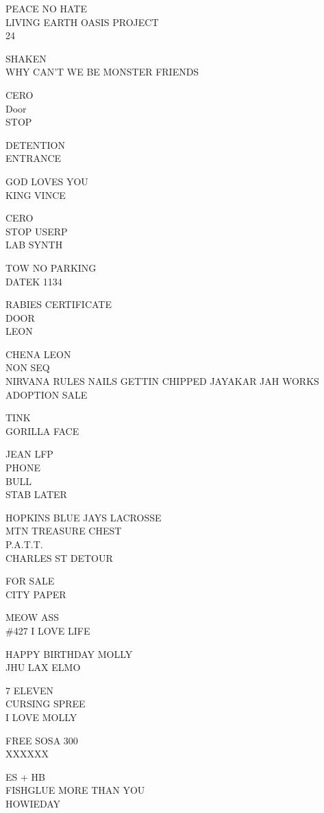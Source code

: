 \documentclass[10pt,letterpaper]{article}
\begin{document}
PEACE NO HATE\\
LIVING EARTH OASIS PROJECT\\
24

SHAKEN\\
WHY CAN'T WE BE MONSTER FRIENDS

CERO\\
Door\\
STOP

DETENTION\\
ENTRANCE

GOD LOVES YOU\\
KING VINCE

CERO\\
STOP USERP\\
LAB SYNTH

TOW NO PARKING\\
DATEK 1134

RABIES CERTIFICATE\\
DOOR\\
LEON

CHENA LEON\\
NON SEQ\\
NIRVANA RULES NAILS GETTIN CHIPPED JAYAKAR JAH WORKS\\
ADOPTION SALE

TINK\\
GORILLA FACE

JEAN LFP\\
PHONE\\
BULL\\
STAB LATER

HOPKINS BLUE JAYS LACROSSE\\
MTN TREASURE CHEST\\
P.A.T.T.\\
CHARLES ST DETOUR

FOR SALE\\
CITY PAPER

MEOW ASS\\
\#427 I LOVE LIFE

HAPPY BIRTHDAY MOLLY\\
JHU LAX ELMO

7 ELEVEN\\
CURSING SPREE\\
I LOVE MOLLY

FREE SOSA 300\\
XXXXXX

ES  + HB\\
FISHGLUE MORE THAN YOU\\
HOWIEDAY
\end{document}
